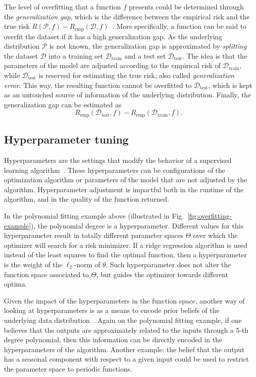 The level of overfitting that a function $f$ presents could be determined through the \emph{generalization gap}, which is the difference between the empirical risk and the true risk $R(\mathcal{P},f) - R_\textrm{emp}(\mathcal{D},f)$~\cite{murphyMachineLearningProbabilistic2013}.
More specifically, a function can be said to overfit the dataset if it has a high generalization gap.
As the underlying distribution $\mathcal{P}$ is not known, the generalization gap is approximated by \emph{splitting} the dataset $\mathcal{D}$ into a training set $\mathcal{D}_\textrm{train}$ and a test set $\mathcal{D}_\textrm{test}$.
The idea is that the parameters of the model are adjusted according to the empirical risk of $\mathcal{D}_\textrm{train}$, while $\mathcal{D}_\textrm{test}$ is reserved for estimating the true risk, also called \emph{generalization error}.
This way, the resulting function cannot be overfitted to $\mathcal{D}_\textrm{test}$, which is kept as an untouched source of information of the underlying distribution.
Finally, the generalization gap can be estimated as  \[
    R_\textrm{emp}(\mathcal{D}_\textrm{test},f) - R_\textrm{emp}(\mathcal{D}_\textrm{train},f)
.\] 

\subsection{Hyperparameter tuning}

Hyperparameters are the settings that modify the behavior of a supervised learning algorithm~\cite{Goodfellow-et-al-2016}.
These hyperparameters can be configurations of the optimization algorithm or parameters of the model that are not adjusted by the algorithm.
Hyperparameter adjustment is impactful both in the runtime of the algorithm, and in the quality of the function returned.

In the polynomial fitting example above (illustrated in Fig.~\ref{fig:overfitting-example}), the polynomial degree is a hyperparameter.
Different values for this hyperparameter result in totally different parameter spaces $\Theta$ over which the optimizer will search for a risk minimizer.
If a ridge regression algorithm is used instead of the least squares to find the optimal function, then a hyperparameter is the weight of the $\ell_2$-norm of $\theta$.
Such hyperparameter does not alter the function space associated to $\Theta$, but guides the optimizer towards different optima.

Given the impact of the hyperparameters in the function space, another way of looking at hyperparameters is as a means to encode prior beliefs of the underlying data distribution~\cite{murphyMachineLearningProbabilistic2013}.
Again on the polynomial fitting example, if one believes that the outputs are approximately related to the inputs through a 5-th degree polynomial, then this information can be directly encoded in the hyperparameters of the algorithm.
Another example: the belief that the output has a seasonal component with respect to a given input could be used to restrict the parameter space to periodic functions.

